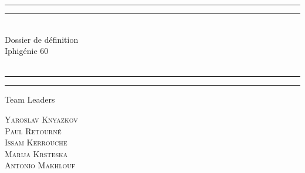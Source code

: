 \begin{titlepage} %

	\centering %

	\scshape %

	\vspace*{\baselineskip} %


	\rule{\textwidth}{1.6pt}\vspace*{-\baselineskip}\vspace*{2pt} %
	\rule{\textwidth}{0.4pt} %

    \vspace{0.75\baselineskip} %

	{\LARGE \hfill \\ Dossier de définition \\ Iphigénie 60 \\ \hfill \\} %

	\vspace{0.75\baselineskip} %

	\rule{\textwidth}{0.4pt}\vspace*{-\baselineskip}\vspace{3.2pt} %
	\rule{\textwidth}{1.6pt} %

	\vspace{2\baselineskip} %


	{\large Team Leaders}

	\vspace{0.25\baselineskip}

	{\scshape\Large Yaroslav Knyazkov \\ Paul Retourné \\ Issam Kerrouche \\ Marija Krsteska \\ Antonio Makhlouf \\ \hfill \\} %

	\vspace{0.75\baselineskip}


\end{titlepage}

